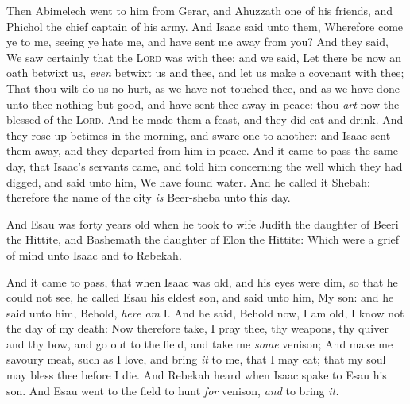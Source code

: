 \documentclass[11pt,letterpaper,oneside]{memoir}
\begin{document}
Then Abimelech went to him from Gerar, and Ahuzzath one of his friends,
and Phichol the chief captain of his army. And Isaac said unto them,
Wherefore come ye to me, seeing ye hate me, and have sent me away from
you? And they said, We saw certainly that the \textsc{Lord} was with thee:
and we said, Let there be now an oath betwixt us, \emph{even} betwixt us
and thee, and let us make a covenant with thee; That thou wilt do us no
hurt, as we have not touched thee, and as we have done unto thee nothing
but good, and have sent thee away in peace: thou \emph{art} now the
blessed of the \textsc{Lord}. And he made them a feast, and they did eat
and drink. And they rose up betimes in the morning, and sware one to
another: and Isaac sent them away, and they departed from him in peace.
And it came to pass the same day, that Isaac's servants came, and told
him concerning the well which they had digged, and said unto him, We
have found water. And he called it Shebah: therefore the name of the
city \emph{is} Beer-sheba unto this day.

And Esau was forty years old when he took to wife Judith the daughter of
Beeri the Hittite, and Bashemath the daughter of Elon the Hittite: Which
were a grief of mind unto Isaac and to Rebekah.

And it came to pass, that when Isaac was old, and his eyes were dim, so
that he could not see, he called Esau his eldest son, and said unto him,
My son: and he said unto him, Behold, \emph{here am} I. And he said,
Behold now, I am old, I know not the day of my death: Now therefore
take, I pray thee, thy weapons, thy quiver and thy bow, and go out to
the field, and take me \emph{some} venison; And make me savoury meat,
such as I love, and bring \emph{it} to me, that I may eat; that my soul
may bless thee before I die. And Rebekah heard when Isaac spake to Esau
his son. And Esau went to the field to hunt \emph{for} venison,
\emph{and} to bring \emph{it.}
\end{document}
